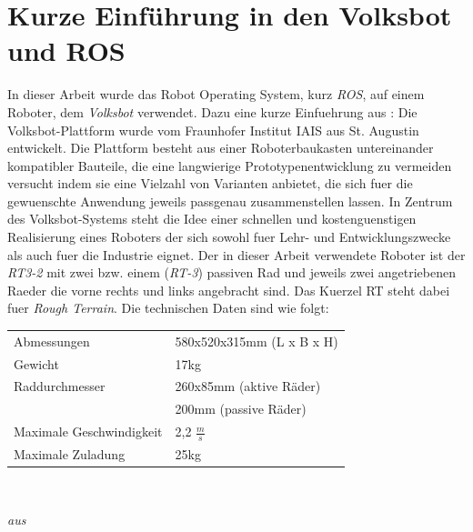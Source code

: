 \documentclass[11pt,a4paper]{article}
\begin{document}
\section{Kurze Einführung in den Volksbot und ROS}
In dieser Arbeit wurde das Robot Operating System, kurz \textit{ROS}, auf einem Roboter, dem \textit{Volksbot} verwendet. Dazu eine kurze Einfuehrung aus \cite{paper:volksbot}: Die Volksbot-Plattform wurde vom Fraunhofer Institut IAIS aus St. Augustin entwickelt.
Die Plattform besteht aus einer Roboterbaukasten untereinander kompatibler Bauteile, die eine langwierige Prototypenentwicklung zu vermeiden versucht indem sie eine Vielzahl von Varianten anbietet, die sich fuer die
gewuenschte Anwendung jeweils passgenau zusammenstellen lassen. In Zentrum des Volksbot-Systems steht die Idee einer schnellen und kostenguenstigen Realisierung eines Roboters der sich sowohl fuer Lehr- und Entwicklungszwecke als auch
fuer die Industrie eignet. 
Der in dieser Arbeit verwendete Roboter ist der \textit{RT3-2} mit zwei bzw. einem (\textit{RT-3}) passiven Rad und jeweils zwei angetriebenen Raeder die vorne rechts und links angebracht sind.
Das Kuerzel RT steht dabei fuer \textit{Rough Terrain}. 
Die technischen Daten sind wie folgt:\\
\vspace{-5mm}
\begin{center}
\begin{tabular}{| p{5cm} p{5cm} |}
  \hline
  Abmessungen & 580x520x315mm (L x B x H) \\
  Gewicht & 17kg \\
  
  Raddurchmesser & 260x85mm (aktive Räder) \\
   & 200mm (passive Räder) \\
  Maximale Geschwindigkeit & 2,2 $\frac{m}{s}$ \\
  
  Maximale Zuladung & 25kg \\
  \hline
\end{tabular} \\
\end{center}

\textit{ aus} \cite{website:volksbot} \\
\end{document}
